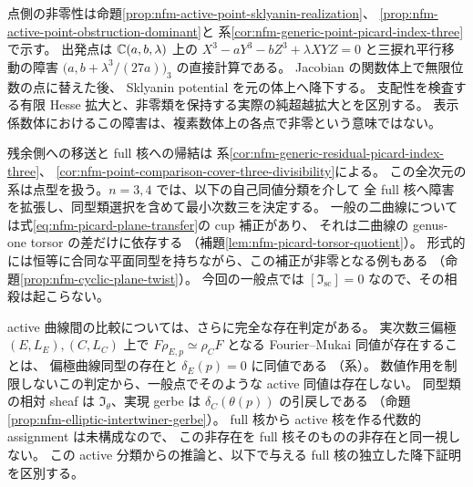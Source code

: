 点側の非零性は命題\ref{prop:nfm-active-point-sklyanin-realization}、
\ref{prop:nfm-active-point-obstruction-dominant}と
系\ref{cor:nfm-generic-point-picard-index-three}で示す。
出発点は $\mathbb C(a,b,\lambda)$ 上の
$X^3-aY^3-bZ^3+\lambda XYZ=0$ と三捩れ平行移動の障害
$\bigl(a,b+\lambda^3/(27a)\bigr)_3$ の直接計算である。
Jacobian の関数体上で無限位数の点に替えた後、
Sklyanin potential を元の体上へ降下する。
支配性を検査する有限 Hesse 拡大と、非零類を保持する実際の純超越拡大とを区別する。
表示係数体におけるこの障害は、複素数体上の各点で非零という意味ではない。

残余側への移送と full 核への帰結は
系\ref{cor:nfm-generic-residual-picard-index-three}、
\ref{cor:nfm-point-comparison-cover-three-divisibility}による。
この全次元の系は点型を扱う。$n=3,4$ では、以下の自己同値分類を介して
全 full 核へ障害を拡張し、同型類選択を含めて最小次数三を決定する。
一般の二曲線については式\eqref{eq:nfm-picard-plane-transfer}の cup 補正があり、
それは二曲線の genus-one torsor の差だけに依存する
（補題\ref{lem:nfm-picard-torsor-quotient}）。
形式的には恒等に合同な平面同型を持ちながら、この補正が非零となる例もある
（命題\ref{prop:nfm-cyclic-plane-twist}）。
今回の一般点では $[\mathfrak I_{\mathrm{sc}}]=0$ なので、その相殺は起こらない。

active 曲線間の比較については、さらに完全な存在判定がある。
実次数三偏極 $(E,L_E),(C,L_C)$ 上で
$F\rho_{E,p}\simeq\rho_CF$ となる Fourier--Mukai 同値が存在することは、
偏極曲線同型の存在と $\delta_E(p)=0$ に同値である
（系）。
数値作用を制限しないこの判定から、一般点でそのような active 同値は存在しない。
同型類の相対 sheaf は $\mathfrak I_\theta$、実現 gerbe は
$\delta_C(\theta(p))$ の引戻しである
（命題\ref{prop:nfm-elliptic-intertwiner-gerbe}）。
full 核から active 核を作る代数的 assignment は未構成なので、
この非存在を full 核そのものの非存在と同一視しない。
この active 分類からの推論と、以下で与える full 核の独立した降下証明を区別する。

